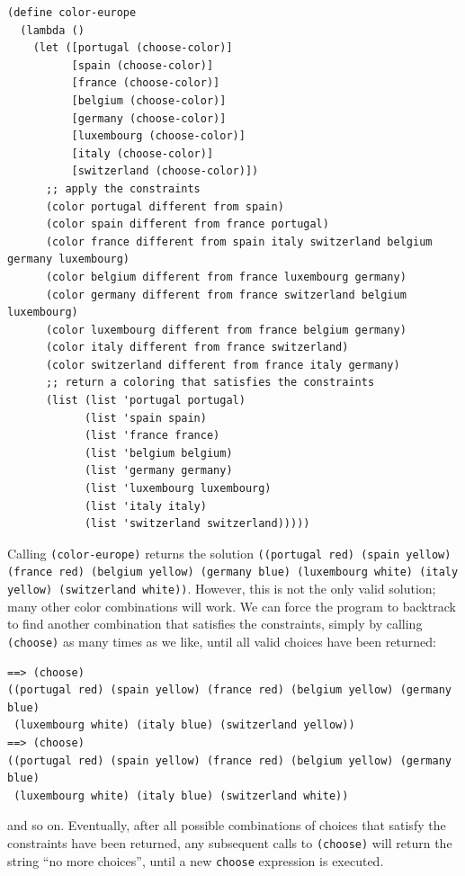\documentclass[acmsmall,screen,authorversion]{acmart}
\begin{document}
\noindent
\begin{minipage}{\textwidth}
{\small
\begin{verbatim}
(define color-europe
  (lambda ()
    (let ([portugal (choose-color)]
          [spain (choose-color)]
          [france (choose-color)]
          [belgium (choose-color)]
          [germany (choose-color)]
          [luxembourg (choose-color)]
          [italy (choose-color)]
          [switzerland (choose-color)])
      ;; apply the constraints
      (color portugal different from spain)
      (color spain different from france portugal)
      (color france different from spain italy switzerland belgium germany luxembourg)
      (color belgium different from france luxembourg germany)
      (color germany different from france switzerland belgium luxembourg)
      (color luxembourg different from france belgium germany)
      (color italy different from france switzerland)
      (color switzerland different from france italy germany)
      ;; return a coloring that satisfies the constraints
      (list (list 'portugal portugal)
            (list 'spain spain)
            (list 'france france)
            (list 'belgium belgium)
            (list 'germany germany)
            (list 'luxembourg luxembourg)
            (list 'italy italy)
            (list 'switzerland switzerland)))))

\end{verbatim}
}
\end{minipage}

\noindent
Calling \texttt{(color-europe)} returns the solution \texttt{((portugal red)
  (spain yellow) (france red) (belgium yellow) (germany blue) (luxembourg
  white) (italy yellow) (switzerland white))}. However, this is not the only
valid solution; many other color combinations will work.  We can force the
program to backtrack to find another combination that satisfies the
constraints, simply by calling \texttt{(choose)} as many times as we like,
until all valid choices have been returned:

{\small
\begin{verbatim}
==> (choose)
((portugal red) (spain yellow) (france red) (belgium yellow) (germany blue)
 (luxembourg white) (italy blue) (switzerland yellow))
==> (choose)
((portugal red) (spain yellow) (france red) (belgium yellow) (germany blue)
 (luxembourg white) (italy blue) (switzerland white))
\end{verbatim}
}

\noindent
and so on.  Eventually, after all possible combinations of choices that satisfy
the constraints have been returned, any subsequent calls to \texttt{(choose)}
will return the string ``no more choices'', until a new \texttt{choose}
expression is executed.
\end{document}
